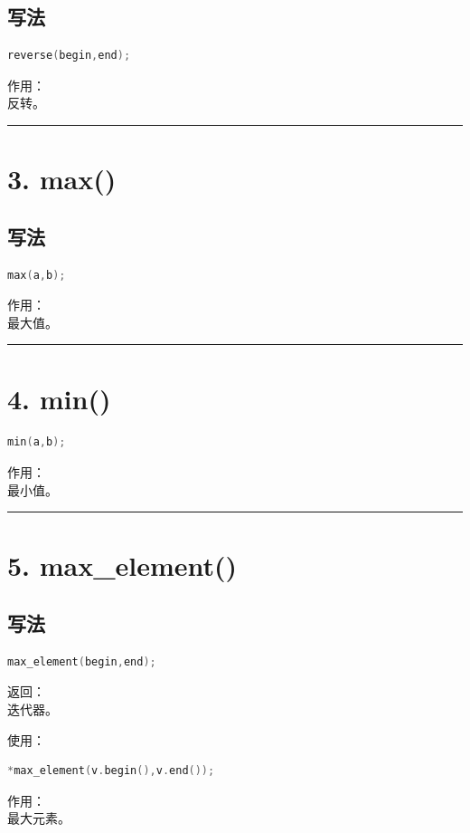 \documentclass[9pt,twocolumn]{extarticle}
\begin{document}
\subsection{写法}
\begin{lstlisting}[language=C++]
reverse(begin,end);
\end{lstlisting}
作用：\\
反转。

\noindent\rule{\linewidth}{0.4pt}

\section{3. max()}

\subsection{写法}
\begin{lstlisting}[language=C++]
max(a,b);
\end{lstlisting}
作用：\\
最大值。

\noindent\rule{\linewidth}{0.4pt}

\section{4. min()}
\begin{lstlisting}[language=C++]
min(a,b);
\end{lstlisting}
作用：\\
最小值。

\noindent\rule{\linewidth}{0.4pt}

\section{5. max\_element()}

\subsection{写法}
\begin{lstlisting}[language=C++]
max_element(begin,end);
\end{lstlisting}
返回：\\
迭代器。

使用：
\begin{lstlisting}[language=C++]
*max_element(v.begin(),v.end());
\end{lstlisting}
作用：\\
最大元素。
\end{document}
